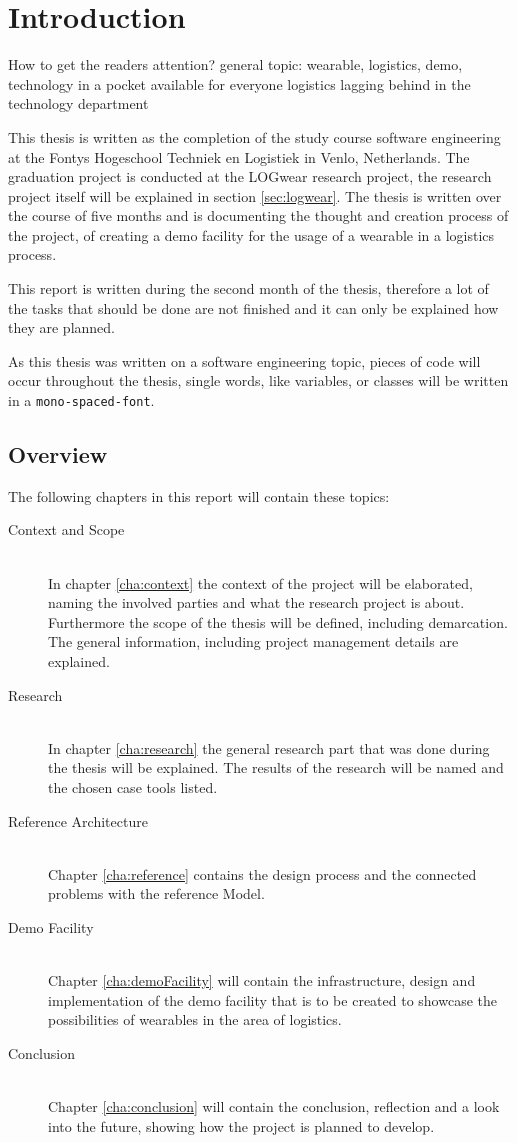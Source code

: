 \chapter{Introduction}
How to get the readers attention?
general topic:
wearable, logistics, demo, 
technology in a pocket available for everyone
logistics lagging behind in the technology department

This thesis is written as the completion of the study course software engineering at the Fontys Hogeschool Techniek en Logistiek in Venlo, Netherlands. The graduation project is conducted at the LOGwear research project, the research project itself will be explained in section \ref{sec:logwear}. The thesis is written over the course of five months and is documenting the thought and creation process of the project, of creating a demo facility for the usage of a wearable in a logistics process.

This report is written during the second month of the thesis, therefore a lot of the tasks that should be done are not finished and it can only be explained how they are planned.

As this thesis was written on a software engineering topic, pieces of code will occur throughout the thesis, single words, like variables, or classes will be written in a \texttt{mono-spaced-font}.
\section*{Overview}
The following chapters in this report will contain these topics:

\begin{description}
	\item[Context and Scope] \hfill \\
	In chapter \ref{cha:context} the context of the project will be elaborated, naming the involved parties and what the research project is about. Furthermore the scope of the thesis will be defined, including demarcation. The general information, including project management details are explained.
	\item[Research] \hfill \\
	In chapter \ref{cha:research} the general research part that was done during the thesis will be explained. The results of the research will be named and the chosen \gls{case} tools listed.
	\item[Reference Architecture] \hfill \\
	Chapter \ref{cha:reference} contains the design process and the connected problems with the reference Model.
	\item[Demo Facility] \hfill \\
	Chapter \ref{cha:demoFacility} will contain the infrastructure, design and implementation of the demo facility that is to be created to showcase the possibilities of wearables in the area of logistics.
	\item[Conclusion] \hfill \\
	Chapter \ref{cha:conclusion} will contain the conclusion, reflection and a look into the future, showing how the project is planned to develop.
\end{description}